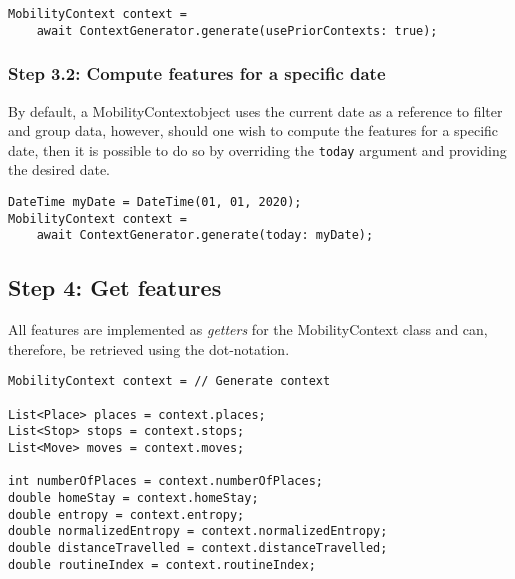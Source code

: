 \begin{verbatim}
MobilityContext context = 
    await ContextGenerator.generate(usePriorContexts: true);
\end{verbatim}

\subsubsection*{Step 3.2: Compute features for a specific date}
By default, a MobilityContextobject uses the current date as a reference to filter and group data, however, should one wish to compute the features for a specific date, then it is possible to do so by overriding the \verb|today| argument and providing the desired date.

\begin{verbatim}
DateTime myDate = DateTime(01, 01, 2020);
MobilityContext context = 
    await ContextGenerator.generate(today: myDate);
\end{verbatim}

\subsection*{Step 4: Get features}
All features are implemented as \textit{getters} for the MobilityContext class and can, therefore, be retrieved using the dot-notation. 

\begin{verbatim}
MobilityContext context = // Generate context

List<Place> places = context.places;
List<Stop> stops = context.stops;
List<Move> moves = context.moves;

int numberOfPlaces = context.numberOfPlaces;
double homeStay = context.homeStay;
double entropy = context.entropy;
double normalizedEntropy = context.normalizedEntropy;
double distanceTravelled = context.distanceTravelled;
double routineIndex = context.routineIndex;
\end{verbatim}